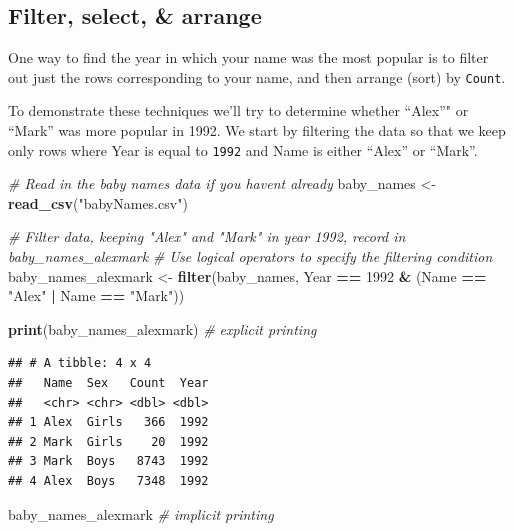 \documentclass[
]{book}
\newenvironment{Shaded}{\begin{snugshade}}{\end{snugshade}}
\newcommand{\CommentTok}[1]{\textcolor[rgb]{0.56,0.35,0.01}{\textit{#1}}}
\newcommand{\DecValTok}[1]{\textcolor[rgb]{0.00,0.00,0.81}{#1}}
\newcommand{\KeywordTok}[1]{\textcolor[rgb]{0.13,0.29,0.53}{\textbf{#1}}}
\newcommand{\NormalTok}[1]{#1}
\newcommand{\OperatorTok}[1]{\textcolor[rgb]{0.81,0.36,0.00}{\textbf{#1}}}
\newcommand{\StringTok}[1]{\textcolor[rgb]{0.31,0.60,0.02}{#1}}
\begin{document}
\hypertarget{filter-select-arrange}{%
\subsection{Filter, select, \& arrange}\label{filter-select-arrange}}

One way to find the year in which your name was the most popular is to filter out just the rows corresponding to your name, and then arrange (sort) by \texttt{Count}.

To demonstrate these techniques we'll try to determine whether ``Alex''" or ``Mark'' was more popular in 1992. We start by filtering the data so that we keep only rows where Year is equal to \texttt{1992} and Name is either ``Alex'' or ``Mark''.

\begin{Shaded}
\begin{Highlighting}[]
\CommentTok{\# Read in the baby names data if you haven\textquotesingle{}t already}
\NormalTok{baby\_names \textless{}{-}}\StringTok{ }\KeywordTok{read\_csv}\NormalTok{(}\StringTok{"babyNames.csv"}\NormalTok{)}
\end{Highlighting}
\end{Shaded}

\begin{Shaded}
\begin{Highlighting}[]
\CommentTok{\# Filter data, keeping "Alex" and "Mark" in year 1992, record in baby\_names\_alexmark}
\CommentTok{\# Use logical operators to specify the filtering condition}
\NormalTok{baby\_names\_alexmark \textless{}{-}}\StringTok{ }\KeywordTok{filter}\NormalTok{(baby\_names, }
\NormalTok{             Year }\OperatorTok{==}\StringTok{ }\DecValTok{1992} \OperatorTok{\&}\StringTok{ }\NormalTok{(Name }\OperatorTok{==}\StringTok{ "Alex"} \OperatorTok{|}\StringTok{ }\NormalTok{Name }\OperatorTok{==}\StringTok{ "Mark"}\NormalTok{))}

\KeywordTok{print}\NormalTok{(baby\_names\_alexmark) }\CommentTok{\# explicit printing}
\end{Highlighting}
\end{Shaded}

\begin{verbatim}
## # A tibble: 4 x 4
##   Name  Sex   Count  Year
##   <chr> <chr> <dbl> <dbl>
## 1 Alex  Girls   366  1992
## 2 Mark  Girls    20  1992
## 3 Mark  Boys   8743  1992
## 4 Alex  Boys   7348  1992
\end{verbatim}

\begin{Shaded}
\begin{Highlighting}[]
\NormalTok{baby\_names\_alexmark }\CommentTok{\# implicit printing}
\end{Highlighting}
\end{Shaded}
\end{document}
